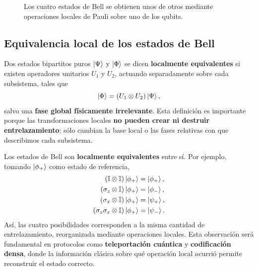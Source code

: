 \documentclass[12pt,a4paper]{article}
\theoremstyle{definition}
\theoremstyle{plain}
\theoremstyle{remark}
\newcommand{\I}{\mathbb{I}}
\begin{document}
\begin{figure}[htbp]
    \centering
    \caption{Los cuatro estados de Bell se obtienen unos de otros mediante operaciones locales de Pauli sobre uno de los qubits.}
    \label{fig:orbita-local-bell}
\end{figure}

\subsection{Equivalencia local de los estados de Bell}

Dos estados bipartitos puros $\ket{\Psi}$ y $\ket{\Phi}$ se dicen \textbf{localmente equivalentes} si existen operadores unitarios $U_1$ y $U_2$, actuando separadamente sobre cada subsistema, tales que
\begin{equation*}
    \ket{\Phi}=\left(U_1\otimes U_2\right)\ket{\Psi},
\end{equation*}
salvo una \textbf{fase global físicamente irrelevante}. Esta definición es importante porque las transformaciones locales \textbf{no pueden crear ni destruir entrelazamiento}: sólo cambian la base local o las fases relativas con que describimos cada subsistema.

Los estados de Bell son \textbf{localmente equivalentes} entre sí. Por ejemplo, tomando $\ket{\phi_+}$ como estado de referencia,
\begin{align*}
    \left(\I\otimes\I\right)\ket{\phi_+}&=\ket{\phi_+},\\
    \left(\sigma_z\otimes\I\right)\ket{\phi_+}&=\ket{\phi_-},\\
    \left(\sigma_x\otimes\I\right)\ket{\phi_+}&=\ket{\psi_+},\\
    \left(\sigma_z\sigma_x\otimes\I\right)\ket{\phi_+}&=\ket{\psi_-}.
\end{align*}
Así, las cuatro posibilidades corresponden a la misma cantidad de entrelazamiento, reorganizada mediante operaciones locales. Esta observación será fundamental en protocolos como \textbf{teleportación cuántica} y \textbf{codificación densa}, donde la información clásica sobre qué operación local ocurrió permite reconstruir el estado correcto.
\end{document}
